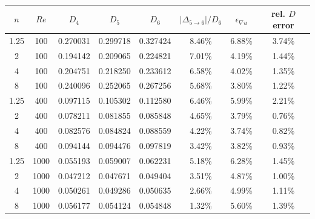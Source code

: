 \begin{tabular}{@{}cccccccc@{}}
\toprule
$n$ & $Re$ & $D_{4}$ & $D_{5}$ & $D_{6}$ & $|\Delta_{5\to6}|/D_6$ & $\epsilon_{\nabla u}$ & rel. $D$ error \\
\midrule
1.25 & 100 & 0.270031 & 0.299718 & 0.327424 & 8.46\% & 6.88\% & 3.74\% \\
2 & 100 & 0.194142 & 0.209065 & 0.224821 & 7.01\% & 4.19\% & 1.44\% \\
4 & 100 & 0.204751 & 0.218250 & 0.233612 & 6.58\% & 4.02\% & 1.35\% \\
8 & 100 & 0.240096 & 0.252065 & 0.267256 & 5.68\% & 3.80\% & 1.22\% \\
1.25 & 400 & 0.097115 & 0.105302 & 0.112580 & 6.46\% & 5.99\% & 2.21\% \\
2 & 400 & 0.078211 & 0.081855 & 0.085848 & 4.65\% & 3.79\% & 0.76\% \\
4 & 400 & 0.082576 & 0.084824 & 0.088559 & 4.22\% & 3.74\% & 0.82\% \\
8 & 400 & 0.094144 & 0.094476 & 0.097819 & 3.42\% & 3.82\% & 0.93\% \\
1.25 & 1000 & 0.055193 & 0.059007 & 0.062231 & 5.18\% & 6.28\% & 1.45\% \\
2 & 1000 & 0.047212 & 0.047671 & 0.049404 & 3.51\% & 4.87\% & 1.00\% \\
4 & 1000 & 0.050261 & 0.049286 & 0.050635 & 2.66\% & 4.99\% & 1.11\% \\
8 & 1000 & 0.056177 & 0.054124 & 0.054848 & 1.32\% & 5.60\% & 1.39\% \\
\bottomrule
\end{tabular}